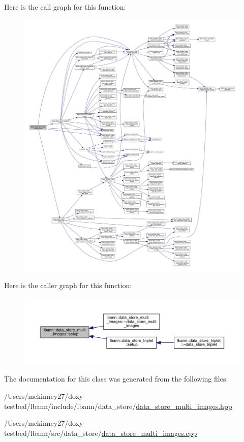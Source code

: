 Here is the call graph for this function\+:\nopagebreak
\begin{figure}[H]
\begin{center}
\leavevmode
\includegraphics[width=350pt]{classlbann_1_1data__store__multi__images_a7b5e9ec7b7132872299a204d5d24ee62_cgraph}
\end{center}
\end{figure}
Here is the caller graph for this function\+:\nopagebreak
\begin{figure}[H]
\begin{center}
\leavevmode
\includegraphics[width=350pt]{classlbann_1_1data__store__multi__images_a7b5e9ec7b7132872299a204d5d24ee62_icgraph}
\end{center}
\end{figure}


The documentation for this class was generated from the following files\+:\begin{DoxyCompactItemize}
\item 
/\+Users/mckinney27/doxy-\/testbed/lbann/include/lbann/data\+\_\+store/\hyperlink{data__store__multi__images_8hpp}{data\+\_\+store\+\_\+multi\+\_\+images.\+hpp}\item 
/\+Users/mckinney27/doxy-\/testbed/lbann/src/data\+\_\+store/\hyperlink{data__store__multi__images_8cpp}{data\+\_\+store\+\_\+multi\+\_\+images.\+cpp}\end{DoxyCompactItemize}
